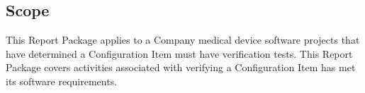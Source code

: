 \subsection{Scope}
This Report Package applies to a Company medical device software projects that
have determined a Configuration Item must have verification tests.  This Report
Package covers activities associated with verifying a Configuration Item has met
its software requirements.
